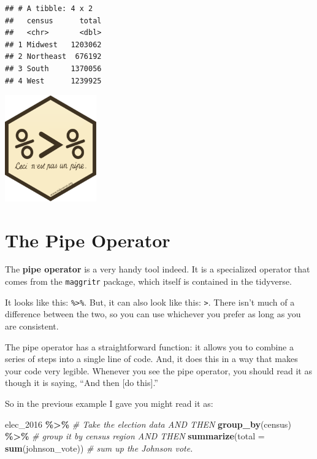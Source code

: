 \documentclass[
]{book}
\newenvironment{Shaded}{\begin{snugshade}}{\end{snugshade}}
\newcommand{\AttributeTok}[1]{\textcolor[rgb]{0.13,0.29,0.53}{#1}}
\newcommand{\CommentTok}[1]{\textcolor[rgb]{0.56,0.35,0.01}{\textit{#1}}}
\newcommand{\FunctionTok}[1]{\textcolor[rgb]{0.13,0.29,0.53}{\textbf{#1}}}
\newcommand{\NormalTok}[1]{#1}
\newcommand{\SpecialCharTok}[1]{\textcolor[rgb]{0.81,0.36,0.00}{\textbf{#1}}}
\begin{document}
\begin{verbatim}
## # A tibble: 4 x 2
##   census      total
##   <chr>       <dbl>
## 1 Midwest   1203062
## 2 Northeast  676192
## 3 South     1370056
## 4 West      1239925
\end{verbatim}

\includegraphics[width=1.55208in,height=\textheight]{docs/_main_files/figure-html/ceci_pipe.png}

\hypertarget{the-pipe-operator}{%
\section{The Pipe Operator}\label{the-pipe-operator}}

The \textbf{pipe operator} is a very handy tool indeed. It is a specialized operator that comes from the \texttt{maggritr} package, which itself is contained in the tidyverse.

It looks like this: \texttt{\%\textgreater{}\%}. But, it can also look like this: \texttt{\textbar{}\textgreater{}}. There isn't much of a difference between the two, so you can use whichever you prefer as long as you are consistent.

The pipe operator has a straightforward function: it allows you to combine a series of steps into a single line of code. And, it does this in a way that makes your code very legible. Whenever you see the pipe operator, you should read it as though it is saying, ``And then {[}do this{]}.''

So in the previous example I gave you might read it as:

\begin{Shaded}
\begin{Highlighting}[]
\NormalTok{elec\_2016 }\SpecialCharTok{\%\textgreater{}\%}                            \CommentTok{\# Take the election data AND THEN}
  \FunctionTok{group\_by}\NormalTok{(census) }\SpecialCharTok{\%\textgreater{}\%}                   \CommentTok{\# group it by census region AND THEN}
  \FunctionTok{summarize}\NormalTok{(}\AttributeTok{total =} \FunctionTok{sum}\NormalTok{(johnson\_vote))   }\CommentTok{\# sum up the Johnson vote.}
\end{Highlighting}
\end{Shaded}
\end{document}
